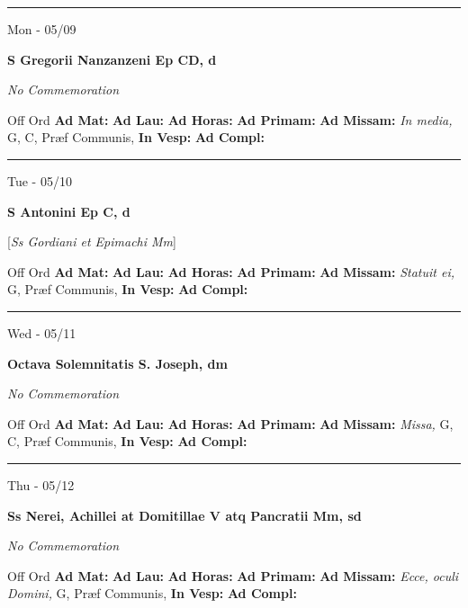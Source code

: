 \documentclass[letterpaper, 10pt]{article}
\begin{document}
\hrule
\begin{center}
Mon - 05/09
\end{center}\textbf{ \large S Gregorii Nanzanzeni Ep CD, \textnormal{\normalsize d}}

\textit{No Commemoration}\begin{justify}
Off Ord
\textbf{Ad Mat: }
\textbf{Ad Lau: }
\textbf{Ad Horas: }
\textbf{Ad Primam: }
\textbf{Ad Missam:} \textit{In media, } G, C, Præf Communis, 
\textbf{In Vesp: }
\textbf{Ad Compl: }\end{justify}



\hrule
\begin{center}
Tue - 05/10
\end{center}\textbf{ \large S Antonini Ep C, \textnormal{\normalsize d}}

[\textit{Ss Gordiani et Epimachi Mm}]
\begin{justify}
Off Ord
\textbf{Ad Mat: }
\textbf{Ad Lau: }
\textbf{Ad Horas: }
\textbf{Ad Primam: }
\textbf{Ad Missam:} \textit{Statuit ei, } G, Præf Communis, 
\textbf{In Vesp: }
\textbf{Ad Compl: }\end{justify}



\hrule
\begin{center}
Wed - 05/11
\end{center}\textbf{ \large Octava Solemnitatis S. Joseph, \textnormal{\normalsize dm}}

\textit{No Commemoration}\begin{justify}
Off Ord
\textbf{Ad Mat: }
\textbf{Ad Lau: }
\textbf{Ad Horas: }
\textbf{Ad Primam: }
\textbf{Ad Missam:} \textit{Missa, } G, C, Præf Communis, 
\textbf{In Vesp: }
\textbf{Ad Compl: }\end{justify}



\hrule
\begin{center}
Thu - 05/12
\end{center}\textbf{ \large Ss Nerei, Achillei at Domitillae V atq Pancratii Mm, \textnormal{\normalsize sd}}

\textit{No Commemoration}\begin{justify}
Off Ord
\textbf{Ad Mat: }
\textbf{Ad Lau: }
\textbf{Ad Horas: }
\textbf{Ad Primam: }
\textbf{Ad Missam:} \textit{Ecce, oculi Domini, } G, Præf Communis, 
\textbf{In Vesp: }
\textbf{Ad Compl: }\end{justify}
\end{document}
